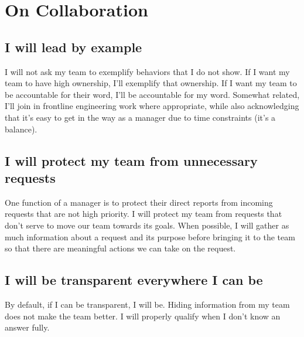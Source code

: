\documentclass[11pt]{amsart}
\begin{document}

\section*{On Collaboration}

\subsection*{I will lead by example}
I will not ask my team to exemplify behaviors that I do not show. If I want my team to have high ownership, I'll exemplify that ownership. If I want my team to be accountable for their word, I'll be accountable for my word. Somewhat related, I'll join in frontline engineering work where appropriate, while also acknowledging that it's easy to get in the way as a manager due to time constraints (it's a balance).

\subsection*{I will protect my team from unnecessary requests}
One function of a manager is to protect their direct reports from incoming requests that are not high priority. I will protect my team from requests that don’t serve to move our team towards its goals. When possible, I will gather as much information about a request and its purpose before bringing it to the team so that there are meaningful actions we can take on the request.

\subsection*{I will be transparent everywhere I can be}
By default, if I can be transparent, I will be. Hiding information from my team does not make the team better. I will properly qualify when I don’t know an answer fully.

\end{document}
